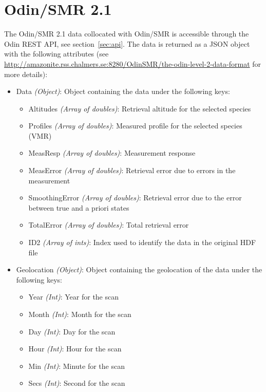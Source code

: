 \section{Odin/SMR 2.1}
The Odin/SMR 2.1 data collocated with Odin/SMR is accessible through the Odin
REST API, see section~\ref{sec:api}. The data is returned as a JSON object with
the following attributes (see
\url{http://amazonite.rss.chalmers.se:8280/OdinSMR/the-odin-level-2-data-format}
for more details):
\begin{itemize}
    \item Data \emph{(Object)}: Object containing the data under the
        following keys:
        \begin{itemize}
            \item Altitudes \emph{(Array of doubles)}: Retrieval altitude for
                the selected species
            \item Profiles \emph{(Array of doubles)}: Measured profile for the
                selected species (VMR)
            \item MeasResp \emph{(Array of doubles)}: Measurement response
            \item MeasError \emph{(Array of doubles)}: Retrieval error due to
                errors in the measurement
            \item SmoothingError \emph{(Array of doubles)}: Retrieval error due
                to the error between true and a priori states
            \item TotalError \emph{(Array of doubles)}: Total retrieval error
            \item ID2 \emph{(Array of ints)}: Index used to identify the data
                in the original HDF file
        \end{itemize}
    \item Geolocation \emph{(Object)}: Object containing the
        geolocation of the data under the following keys:
        \begin{itemize}
            \item Year \emph{(Int)}: Year for the scan
            \item Month \emph{(Int)}: Month for the scan
            \item Day \emph{(Int)}: Day for the scan
            \item Hour \emph{(Int)}: Hour for the scan
            \item Min \emph{(Int)}: Minute for the scan
            \item Secs \emph{(Int)}: Second for the scan

\end{itemize}
\end{itemize}
